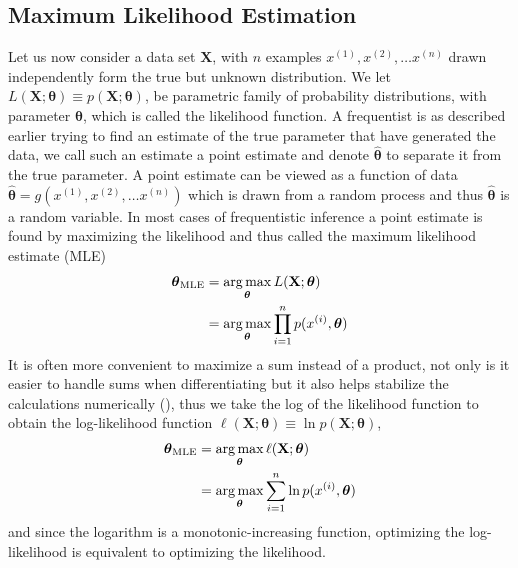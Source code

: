 \subsection{Maximum Likelihood Estimation}
Let us now consider a data set $\mathbf{X}$, with $n$ examples $x^{(1)}, x^{(2)},\ldots x^{(n)}$ drawn independently form the true but unknown distribution. We let
$L(\mathbf{X};\boldsymbol{\theta})\equiv p(\mathbf{X};\boldsymbol{\theta})$, be parametric family of probability distributions, with parameter $\boldsymbol{\theta}$, which is called the likelihood function. A frequentist is as described earlier trying to find an estimate of the true parameter that have generated the data, we call such an estimate a point estimate and denote $\hat{\boldsymbol{\theta}}$ to separate it from the true parameter. A point estimate can be viewed as a function of data $\hat{\boldsymbol{\theta}}=g(x^{(1)}, x^{(2)},\ldots x^{(n)})$ which is drawn from a random process and thus $\hat{\boldsymbol{\theta}}$ is a random variable.
In most cases of frequentistic inference a point estimate is found by maximizing the likelihood and thus called the maximum likelihood estimate (MLE)
\begin{equation*}
\begin{split}
        \boldsymbol{\boldsymbol{\theta}}_{\text{MLE}}&=\operatorname*{arg\,max}_{\boldsymbol{\theta}}{L(\mathbf{X};\boldsymbol{\theta})}\\
        & = \operatorname*{arg\,max}_{\boldsymbol{\theta}}{\prod^n_{i=1}p(x^{(i)},\boldsymbol{\theta})}
\end{split}
\end{equation*}
It is often more convenient to maximize a sum instead of a product, not only is it easier to handle sums when differentiating but it also helps stabilize the calculations numerically (\cite{Goodfellow-et-al-2016}), thus we take the log of the likelihood function to obtain the log-likelihood function $\ell(\mathbf{X};\boldsymbol{\theta})\equiv \ln{p(\mathbf{X};\boldsymbol{\theta})}$,
\begin{equation*}
\begin{split}
        \boldsymbol{\boldsymbol{\theta}}_{\text{MLE}}&=\operatorname*{arg\,max}_{\boldsymbol{\theta}}{\ell(\mathbf{X};\boldsymbol{\theta})}\\
        &=\operatorname*{arg\,max}_{\boldsymbol{\boldsymbol{\theta}}}{\sum^n_{i=1}\ln{p(x^{(i)},\boldsymbol{\theta})}}
\end{split}
\end{equation*}
and since the logarithm is a monotonic-increasing function, optimizing the log-likelihood is equivalent to optimizing the likelihood. \\
